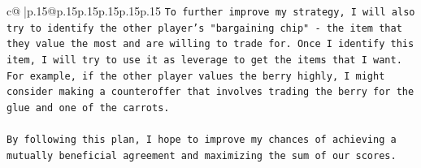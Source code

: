 \documentclass{article}
\begin{document}
{\begin{supertabular}{c@{$\;$}|p{.15\linewidth}@{}p{.15\linewidth}p{.15\linewidth}p{.15\linewidth}p{.15\linewidth}p{.15\linewidth}}
{{{\texttt{To further improve my strategy, I will also try to identify the other player's "bargaining chip" {-} the item that they value the most and are willing to trade for. Once I identify this item, I will try to use it as leverage to get the items that I want. For example, if the other player values the berry highly, I might consider making a counteroffer that involves trading the berry for the glue and one of the carrots.} \\
\\ 
\texttt{By following this plan, I hope to improve my chances of achieving a mutually beneficial agreement and maximizing the sum of our scores.} \\
            }
        }
    }
     \\ \\

\end{supertabular}
}
\end{document}
